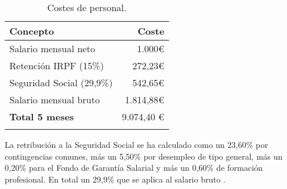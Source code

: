 \begin{longtable}[]{@{}lr@{}}
\toprule
\begin{minipage}[b]{0.38\columnwidth}\raggedright\strut
\textbf{Concepto}\strut
\end{minipage} & \begin{minipage}[b]{0.20\columnwidth}\raggedright\strut
\textbf{Coste}\strut
\end{minipage}\tabularnewline
\midrule
\endhead
\begin{minipage}[t]{0.38\columnwidth}\raggedright\strut
Salario mensual neto\strut
\end{minipage} & \begin{minipage}[t]{0.20\columnwidth}\raggedright\strut
1.000\euro{}\strut
\end{minipage}\tabularnewline
\begin{minipage}[t]{0.38\columnwidth}\raggedright\strut
Retención IRPF (15\%)\strut
\end{minipage} & \begin{minipage}[t]{0.20\columnwidth}\raggedright\strut
272,23\euro{}\strut
\end{minipage}\tabularnewline
\begin{minipage}[t]{0.38\columnwidth}\raggedright\strut
Seguridad Social (29,9\%)\strut
\end{minipage} & \begin{minipage}[t]{0.20\columnwidth}\raggedright\strut
542,65\euro{}\strut
\end{minipage}\tabularnewline
\begin{minipage}[t]{0.38\columnwidth}\raggedright\strut
Salario mensual bruto\strut
\end{minipage} & \begin{minipage}[t]{0.20\columnwidth}\raggedright\strut
1.814,88\euro{}\strut
\end{minipage}\tabularnewline
\midrule
\begin{minipage}[t]{0.38\columnwidth}\raggedright\strut
\textbf{Total 5 meses}\strut
\end{minipage} & \begin{minipage}[t]{0.20\columnwidth}\raggedright\strut
9.074,40 \euro{}\strut
\end{minipage}\tabularnewline
\bottomrule
\caption{Costes de personal.}
\end{longtable}

La retribución a la Seguridad Social se ha calculado como un 23,60\% por
contingencias comunes, más un 5,50\% por desempleo de tipo general, más
un 0,20\% para el Fondo de Garantía Salarial y más un 0,60\% de
formación profesional. En total un 29,9\% que se aplica al salario bruto
\citep{ss_cotizacion}.


